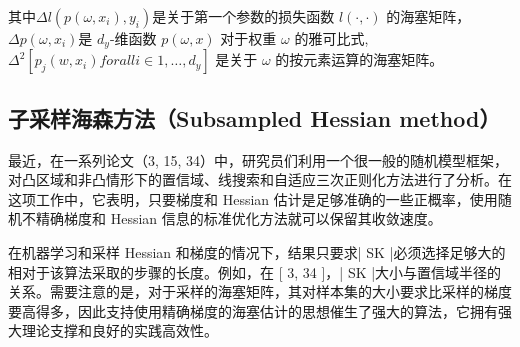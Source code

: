 \documentclass{book}
\begin{document}
其中$\Delta l(p(\omega,x_i),y_i)$是关于第一个参数的损失函数 $l(·, ·)$ 的海塞矩阵，$\Delta p(\omega,x_i)$是 $d_y$-维函数 $p(\omega, x)$ 对于权重 $\omega$ 的雅可比式,$\Delta^2[p_j(w,x_i) for all i\in{1,\ldots,d_y}]$ 是关于 $\omega$ 的按元素运算的海塞矩阵。

\subsection{子采样海森方法（Subsampled Hessian method）}

最近，在一系列论文（3, 15, 34）中，研究员们利用一个很一般的随机模型框架，对凸区域和非凸情形下的置信域、线搜索和自适应三次正则化方法进行了分析。在这项工作中，它表明，只要梯度和 Hessian 估计是足够准确的一些正概率，使用随机不精确梯度和 Hessian 信息的标准优化方法就可以保留其收敛速度。

在机器学习和采样 Hessian 和梯度的情况下，结果只要求| SK |必须选择足够大的相对于该算法采取的步骤的长度。例如，在 [ 3, 34 ]，| SK |大小与置信域半径的关系。需要注意的是，对于采样的海塞矩阵，其对样本集的大小要求比采样的梯度要高得多，因此支持使用精确梯度的海塞估计的思想催生了强大的算法，它拥有强大理论支撑和良好的实践高效性。
\end{document}
